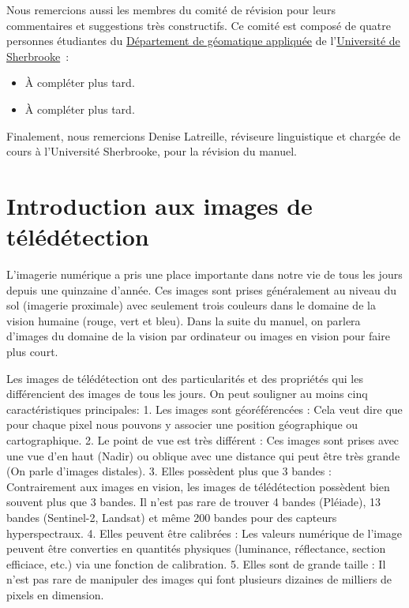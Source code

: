 \documentclass[
  letterpaper,
  DIV=11,
  numbers=noendperiod]{scrreprt}
\begin{document}
Nous remercions aussi les membres du comité de révision pour leurs
commentaires et suggestions très constructifs. Ce comité est composé de
quatre personnes étudiantes du
\href{https://www.usherbrooke.ca/geomatique/}{Département de géomatique
appliquée} de l'\href{https://www.usherbrooke.ca/}{Université de
Sherbrooke}~:

\begin{itemize}
\item
  À compléter plus tard.
\item
  À compléter plus tard.
\end{itemize}

Finalement, nous remercions Denise Latreille, réviseure linguistique et
chargée de cours à l'Université Sherbrooke, pour la révision du manuel.

\section*{Introduction aux images de télédétection}\label{sect006}


L'imagerie numérique a pris une place importante dans notre vie de tous
les jours depuis une quinzaine d'année. Ces images sont prises
généralement au niveau du sol (imagerie proximale) avec seulement trois
couleurs dans le domaine de la vision humaine (rouge, vert et bleu).
Dans la suite du manuel, on parlera d'images du domaine de la vision par
ordinateur ou images en vision pour faire plus court.

Les images de télédétection ont des particularités et des propriétés qui
les différencient des images de tous les jours. On peut souligner au
moins cinq caractéristiques principales: 1. Les images sont
géoréférencées : Cela veut dire que pour chaque pixel nous pouvons y
associer une position géographique ou cartographique. 2. Le point de vue
est très différent : Ces images sont prises avec une vue d'en haut
(Nadir) ou oblique avec une distance qui peut être très grande (On parle
d'images distales). 3. Elles possèdent plus que 3 bandes : Contrairement
aux images en vision, les images de télédétection possèdent bien souvent
plus que 3 bandes. Il n'est pas rare de trouver 4 bandes (Pléiade), 13
bandes (Sentinel-2, Landsat) et même 200 bandes pour des capteurs
hyperspectraux. 4. Elles peuvent être calibrées : Les valeurs numérique
de l'image peuvent être converties en quantités physiques (luminance,
réflectance, section efficiace, etc.) via une fonction de calibration.
5. Elles sont de grande taille : Il n'est pas rare de manipuler des
images qui font plusieurs dizaines de milliers de pixels en dimension.
\end{document}
